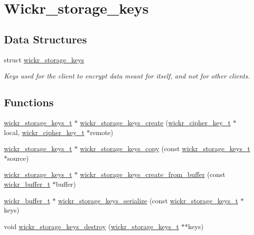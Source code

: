 \hypertarget{group__wickr__storage__keys}{}\section{Wickr\+\_\+storage\+\_\+keys}
\label{group__wickr__storage__keys}
\subsection*{Data Structures}
\begin{DoxyCompactItemize}
\item 
struct \hyperlink{structwickr__storage__keys}{wickr\+\_\+storage\+\_\+keys}
\begin{DoxyCompactList}\small\item\em Key\textquotesingle{}s used for the client to encrypt data meant for itself, and not for other clients. \end{DoxyCompactList}\end{DoxyCompactItemize}
\subsection*{Functions}
\begin{DoxyCompactItemize}
\item 
\hyperlink{structwickr__storage__keys}{wickr\+\_\+storage\+\_\+keys\+\_\+t} $\ast$ \hyperlink{group__wickr__storage__keys_gad03ddd5ea10633ca35097e5f4707d5cb}{wickr\+\_\+storage\+\_\+keys\+\_\+create} (\hyperlink{structwickr__cipher__key}{wickr\+\_\+cipher\+\_\+key\+\_\+t} $\ast$local, \hyperlink{structwickr__cipher__key}{wickr\+\_\+cipher\+\_\+key\+\_\+t} $\ast$remote)
\item 
\hyperlink{structwickr__storage__keys}{wickr\+\_\+storage\+\_\+keys\+\_\+t} $\ast$ \hyperlink{group__wickr__storage__keys_gad6839a21bca1c28775d51deb6b7c3835}{wickr\+\_\+storage\+\_\+keys\+\_\+copy} (const \hyperlink{structwickr__storage__keys}{wickr\+\_\+storage\+\_\+keys\+\_\+t} $\ast$source)
\item 
\hyperlink{structwickr__storage__keys}{wickr\+\_\+storage\+\_\+keys\+\_\+t} $\ast$ \hyperlink{group__wickr__storage__keys_gae5631d93182e635fb7f48269eb3f1723}{wickr\+\_\+storage\+\_\+keys\+\_\+create\+\_\+from\+\_\+buffer} (const \hyperlink{structwickr__buffer}{wickr\+\_\+buffer\+\_\+t} $\ast$buffer)
\item 
\hyperlink{structwickr__buffer}{wickr\+\_\+buffer\+\_\+t} $\ast$ \hyperlink{group__wickr__storage__keys_ga10a0d6e13442682b2fecff2ed753c2f6}{wickr\+\_\+storage\+\_\+keys\+\_\+serialize} (const \hyperlink{structwickr__storage__keys}{wickr\+\_\+storage\+\_\+keys\+\_\+t} $\ast$keys)
\item 
void \hyperlink{group__wickr__storage__keys_ga2c1494802577d025d70bf553c43da344}{wickr\+\_\+storage\+\_\+keys\+\_\+destroy} (\hyperlink{structwickr__storage__keys}{wickr\+\_\+storage\+\_\+keys\+\_\+t} $\ast$$\ast$keys)
\end{DoxyCompactItemize}


